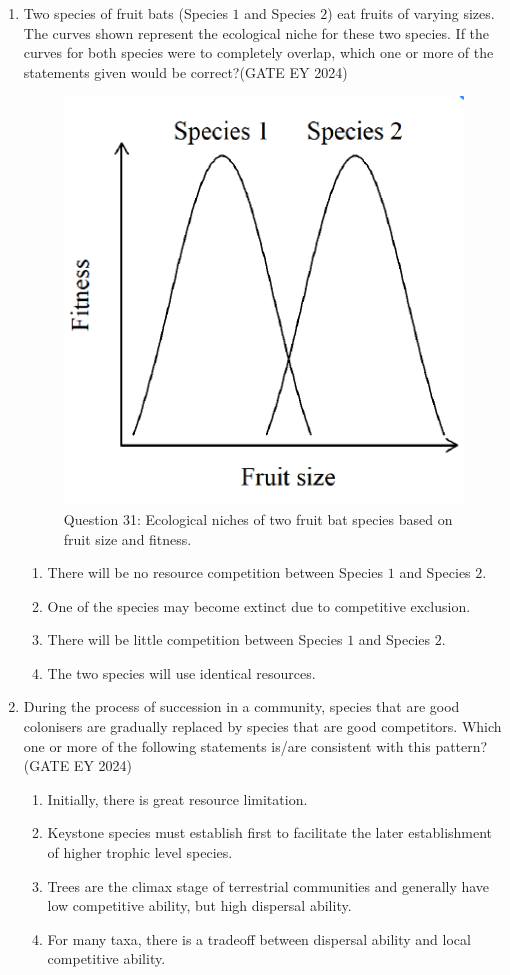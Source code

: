\begin{enumerate}
\item Two species of fruit bats (Species $1$ and Species $2$) eat fruits of varying sizes. The curves shown represent the ecological niche for these two species. If the curves for both species were to completely overlap, which one or more of the statements given would be correct?\hfill{(GATE EY 2024)}
\begin{figure}[H]
    \centering
    \includegraphics[width=0.6\columnwidth]{figs/Q-31.png}
    \caption{Question 31: Ecological niches of two fruit bat species based on fruit size and fitness.}
    \label{Q.31}
\end{figure}
    \begin{enumerate}
        \item There will be no resource competition between Species $1$ and Species $2$.
        \item One of the species may become extinct due to competitive exclusion.
        \item There will be little competition between Species $1$ and Species $2$.
        \item The two species will use identical resources.
    \end{enumerate}

\item During the process of succession in a community, species that are good colonisers are gradually replaced by species that are good competitors. Which one or more of the following statements is/are consistent with this pattern?\hfill{(GATE EY 2024)}
    \begin{enumerate}
        \item Initially, there is great resource limitation.
        \item Keystone species must establish first to facilitate the later establishment of higher trophic level species.
        \item Trees are the climax stage of terrestrial communities and generally have low competitive ability, but high dispersal ability.
        \item For many taxa, there is a tradeoff between dispersal ability and local competitive ability.
    \end{enumerate}


\end{enumerate}
